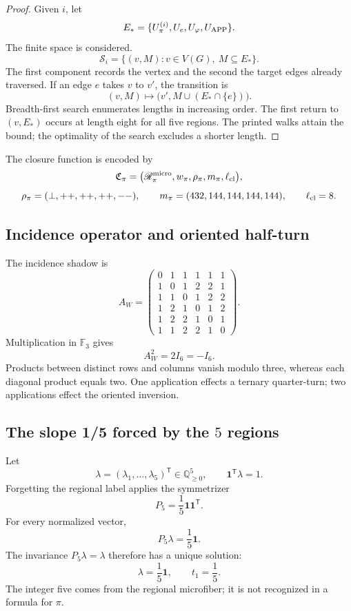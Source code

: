 \begin{proof}
Given \(i\), let
\[
 E_*=\{U_\pi^{(i)},U_e,U_\varphi,U_{\rm APP}\}.
\]
The finite space is considered.
\[
 \mathscr S_i=\{(v,M):v\in V(G),\ M\subseteq E_*\}.
\]
The first component records the vertex and the second the target edges
already traversed. If an edge \(e\) takes \(v\) to \(v'\), the transition is
\[
 (v,M)\longmapsto
 \bigl(v',M\cup(E_*\cap\{e\})\bigr).
\]
Breadth-first search enumerates lengths in increasing order. The first
return to \((v,E_*)\) occurs at length eight for all five regions.
The printed walks attain the bound; the optimality of the search excludes
a shorter length.
\end{proof}

The closure function is encoded by
\[
 \mathfrak C_\pi=
 \bigl(\mathscr R_\pi^{\rm micro},
 w_\pi,\rho_\pi,m_\pi,\ell_{\rm cl}\bigr),
\]
\[
 \rho_\pi=(\perp,++ ,++ ,++ ,--),
 \qquad
 m_\pi=(432,144,144,144,144),
 \qquad
 \ell_{\rm cl}=8.
\]

\subsection{Incidence operator and oriented half-turn}

The incidence shadow is
\[
 A_W=
 \begin{pmatrix}
 0&1&1&1&1&1\\
 1&0&1&2&2&1\\
 1&1&0&1&2&2\\
 1&2&1&0&1&2\\
 1&2&2&1&0&1\\
 1&1&2&2&1&0
 \end{pmatrix}.
\]
Multiplication in \(\mathbb F_3\) gives
\begin{equation}
 \boxed{A_W^2=2I_6=-I_6.}
 \label{p12-83-c8-s1:eq:aw-cuadrado-menos-identidad-pi}
\end{equation}
Products between distinct rows and columns vanish modulo three,
whereas each diagonal product equals two. One application effects a ternary
quarter-turn; two applications effect the oriented inversion.

\subsection{The slope 1/5 forced by the \(5\) regions}

Let
\[
 \lambda=(\lambda_1,\ldots,\lambda_5)^{\mathsf T}
 \in\mathbb Q_{\geq0}^5,
 \qquad
 \mathbf1^{\mathsf T}\lambda=1.
\]
Forgetting the regional label applies the symmetrizer
\[
 P_5=\frac15\mathbf1\mathbf1^{\mathsf T}.
\]
For every normalized vector,
\[
 P_5\lambda=\frac15\mathbf1.
\]
The invariance \(P_5\lambda=\lambda\) therefore has a unique solution:
\begin{equation}
 \boxed{\lambda=\frac15\mathbf1,\qquad t_1=\frac15.}
 \label{p12-83-c8-s1:eq:pendiente-primitiva-pi}
\end{equation}
The integer five comes from the regional microfiber; it is not recognized in a
formula for \(\pi\).

